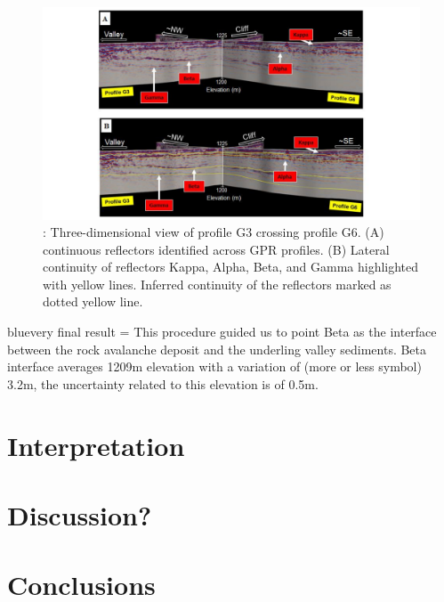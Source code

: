 \documentclass[5p]{elsarticle}
\newcommand{\COMON}{\begin{color}{blue}}
\newcommand{\COMOFF}{\end{color}}
\begin{document}
						   
								   
								   \begin{figure}[h]

	\includegraphics[width=\textwidth]{Figures/Profiles_G3_G6.pdf}
		\caption{: Three-dimensional view of profile G3 crossing profile G6. (A) continuous reflectors identified across GPR profiles. (B) Lateral continuity of reflectors Kappa, Alpha, Beta, and Gamma highlighted with yellow lines. Inferred continuity of the reflectors marked as dotted yellow line.  \label{Profiles_G3_G6}}

								   \end{figure}
	
\COMON very final result = This procedure guided us to point Beta as the interface between the rock avalanche deposit and the underling valley sediments. Beta interface averages 1209m elevation with a variation of (more or less symbol) 3.2m, the uncertainty related to this elevation is of 0.5m.\COMOFF


										
\section{Interpretation}
		
										
				
				
										
\section{Discussion?}
										
										
										
										
										
\section{Conclusions}
\end{document}
